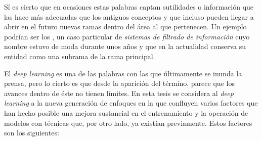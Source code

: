 Sí es cierto que en ocasiones estas palabras captan sutilidades o información que las hace más adecuadas que los antiguos conceptos y que incluso pueden llegar a abrir en el futuro nuevas ramas dentro del área al que pertenecen. Un ejemplo podrían ser los , un caso particular de \textit{sistemas de filtrado de información} cuyo nombre estuvo de moda durante unos años y que en la actualidad conserva su entidad como una subrama de la rama principal.

El \textit{deep learning} es una de las palabras con las que últimamente se inunda la prensa, pero lo cierto es que desde la aparición del término, parece que los avances dentro de éste no tienen límites. En esta tesis se considera al \textit{deep learning} a la nueva generación de enfoques en la que confluyen varios factores que han hecho posible una mejora sustancial en el entrenamiento y la operación de modelos con técnicas que, por otro lado, ya existían previamente. Estos factores son los siguientes:

